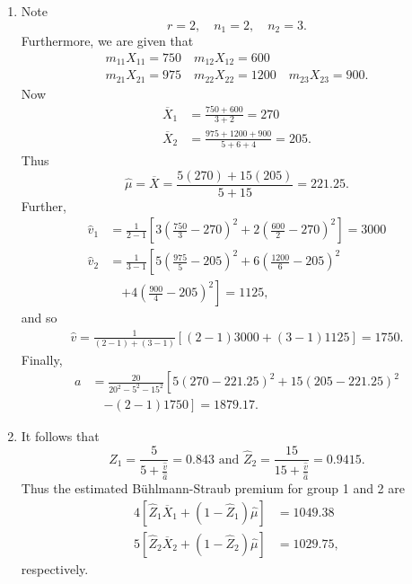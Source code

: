 \documentclass[notoc,notitlepage]{tufte-book}
\begin{document}
\begin{solution}
  \begin{enumerate}
    \item Note
      \begin{equation*}
        r = 2,\quad n_1 = 2,\quad n_2 = 3.
      \end{equation*}
      Furthermore, we are given that
      \begin{gather*}
        m_{11} X_{11} = 750\quad m_{12} X_{12} = 600 \\
        m_{21} X_{21} = 975\quad m_{22} X_{22} = 1200\quad m_{23} X_{23} = 900.
      \end{gather*}
      Now
      \begin{align*}
        \overline{X}_1 &= \frac{750 + 600}{3 + 2} = 270 \\
        \overline{X}_2 &= \frac{975 + 1200 + 900}{5 + 6 + 4} = 205.
      \end{align*}
      Thus
      \begin{equation*}
        \hat{\mu} = \overline{X} = \frac{5(270) + 15(205)}{5 + 15} = 221.25.
      \end{equation*}
      Further,
      \begin{align*}
        \hat{v}_1 &= \frac{1}{2-1} \left[ 3 \left( \frac{750}{3} - 270 \right)^2
            + 2 \left( \frac{600}{2} - 270 \right)^2 \right]
            = 3000 \\
        \hat{v}_2 &= \frac{1}{3-1} \left[ 5 \left( \frac{975}{5} - 205 \right)^2
            + 6 \left( \frac{1200}{6} - 205 \right)^2 \right. \\
            &\quad\left.+ 4 \left( \frac{900}{4} - 205 \right)^2 \right]
            = 1125,
      \end{align*}
      and so
      \begin{align*}
        \hat{v} = \frac{1}{(2 - 1) + (3 - 1)} \left[ 
          (2 - 1) 3000 + (3 - 1) 1125
        \right] = 1750.
      \end{align*}
      Finally,
      \begin{align*}
        a &= \frac{20}{20^2 - 5^2 - 15^2} \left[
          5 \left( 270 - 221.25 \right)^2 + 15 (205 - 221.25)^2 \right. \\
          &\quad\left.- (2-1) 1750 \right] = 1879.17.
      \end{align*}

    \item It follows that
      \begin{equation*}
        \hat{Z}_1 = \frac{5}{5 + \frac{\hat{v}}{\hat{a}}} = 0.843 \text{ and }
        \hat{Z}_2 = \frac{15}{15 + \frac{\hat{v}}{\hat{a}}} = 0.9415.
      \end{equation*}
      Thus the estimated Bühlmann-Straub premium for group 1 and 2 are
      \begin{align*}
        4 [ \hat{Z}_1 \overline{X}_1 + (1 - \hat{Z}_1) \hat{\mu} ] &= 1049.38 \\
        5 [ \hat{Z}_2 \overline{X}_2 + (1 - \hat{Z}_2) \hat{\mu} ] &= 1029.75,
      \end{align*}
      respectively.


\end{enumerate}
\end{solution}
\end{document}
